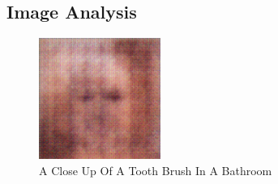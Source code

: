 \documentclass{article}%
\begin{document}
%
\subsection{Image Analysis}%
\label{subsec:ImageAnalysis}%


\begin{figure}[h!]%
\centering%
\includegraphics[width=150px]{500_fake_images/samples_5_154.png}%
\caption{A Close Up Of A Tooth Brush In A Bathroom}%
\end{figure}

%
\end{document}
